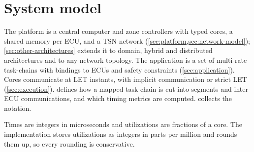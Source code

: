 \section{System model}
\label{sec:model}

\begin{inbrief}
The platform is a central computer and zone controllers with typed
cores, a shared memory per ECU, and a TSN network (\cref{sec:platform,sec:network-model}); \cref{sec:other-architectures} extends it to
domain, hybrid and distributed architectures and to any network topology. The application is a set of multi-rate task-chains
with bindings to ECUs and safety constraints (\cref{sec:application}). Cores
communicate at LET instants, with implicit communication or strict LET (\cref{sec:execution}). 
defines how a mapped task-chain is cut into segments and inter-ECU
communications, and which timing metrics are computed.
 collects the notation.
\end{inbrief}

Times are integers in microseconds and utilizations are fractions of a
core. The implementation stores utilizations as integers in parts per
million and rounds them up, so every rounding is conservative.

